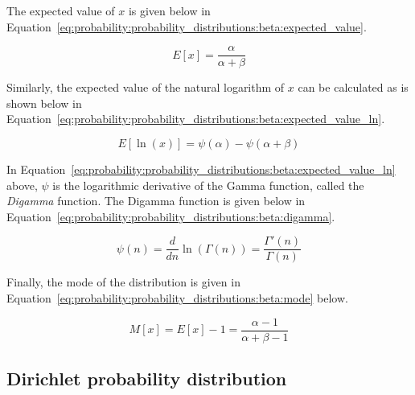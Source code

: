 The expected value of $x$ is given below in Equation~\eqref{eq:probability:probability_distributions:beta:expected_value}.

\begin{equation}
      \label{eq:probability:probability_distributions:beta:expected_value}
      E[x] = \frac{\alpha}{\alpha + \beta}
\end{equation}

Similarly, the expected value of the natural logarithm of $x$ can be calculated as is shown below in Equation~\eqref{eq:probability:probability_distributions:beta:expected_value_ln}.

\begin{equation}
      \label{eq:probability:probability_distributions:beta:expected_value_ln}
      E[\ln(x)] = \psi({\alpha}) - \psi(\alpha + \beta)
\end{equation}

In Equation~\eqref{eq:probability:probability_distributions:beta:expected_value_ln} above, $\psi$ is the logarithmic derivative of the Gamma function, called the \textit{Digamma} function. The Digamma function is given below in Equation~\eqref{eq:probability:probability_distributions:beta:digamma}.

\begin{equation}
      \label{eq:probability:probability_distributions:beta:digamma}
      \psi(n) = \frac{d}{dn}\ln(\Gamma(n)) = \frac{\Gamma'(n)}{\Gamma(n)}
\end{equation}

Finally, the mode of the distribution is given in Equation~\eqref{eq:probability:probability_distributions:beta:mode} below.

\begin{equation}
      \label{eq:probability:probability_distributions:beta:mode}
      M[x] = E[x] - 1 = \frac{\alpha - 1}{\alpha + \beta - 1}
\end{equation}


\subsection{Dirichlet probability distribution}\label{sec:probability:probability_distributions:dirichlet}

